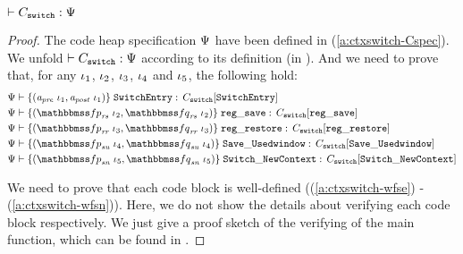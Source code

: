 \begin{lemma}
    \em
    \label{lemma:wfcdhp}
    $\vdash {C_{\texttt{switch}}} : {\Psi{}}$
\end{lemma}
\begin{proof}
    The code heap specification $\Psi{}$ have been 
    defined in (\ref{a:ctxswitch-Cspec}). We unfold 
    $\vdash {C_{\texttt{switch}}} : {\Psi{}}$ 
    according to its definition 
    (in \Fig{\ref{fig:Selected Inference Rules for Refinement Verification}}). 
    And we need to prove that, for any $\iota_1$, 
    $\iota_2$, $\iota_3$, 
    $\iota_4$ and $\iota_5$, the following hold: 
    \begin{align}
        & \wfcblk{\Apre \ \lgvl_1}{\Apost \ \lgvl_1}
            {\texttt{SwitchEntry}}
            {\code_{\texttt{switch}}[\texttt{SwitchEntry}]}
            \label{a:ctxswitch-wfse} \\
        & \wfcblk{\relspecpre_{\textit{rs}} \ \lgvl_2}
            {\relspecpost_{\textit{rs}} \ \lgvl_2}
            {\texttt{reg}\_\texttt{save}}
            {\code_{\texttt{switch}}[\texttt{reg}\_\texttt{save}]} 
            \label{a:ctxswitch-wfrs} \\
        & \wfcblk{\relspecpre_{\textit{rr}} \ \lgvl_3}
            {\relspecpost_{\textit{rr}}\ \lgvl_3}
            {\texttt{reg}\_\texttt{restore}}
            {\code_{\texttt{switch}}[\texttt{reg}\_\texttt{restore}]} 
            \label{a:ctxswitch-wfrr} \\
        & \wfcblk{\relspecpre_{\textit{su}} \ \lgvl_4}
            {\relspecpost_{\textit{su}} \ \lgvl_4}
            {\SaveUsedWin}{\code_{\texttt{switch}}[\SaveUsedWin]} 
            \label{a:ctxswitch-wfsu} \\
        & \wfcblk{\relspecpre_{\textit{sn}} \ \lgvl_5}
            {\relspecpost_{\textit{sn}} \ \lgvl_5}
            {\SwitchNewTask}
            {\code_{\texttt{switch}}[\SwitchNewTask]}
            \label{a:ctxswitch-wfsn}
    \end{align} 

    We need to prove that each code block 
    is well-defined ((\ref{a:ctxswitch-wfse}) - 
    (\ref{a:ctxswitch-wfsn})). Here, we do not 
    show the details about verifying each code block 
    respectively. We just give a proof sketch 
    of the verifying of the main function, which can be found in 
    \Fig{\ref{fig:Proof Sketch of the Context Switch Routine}}.



\end{proof}
